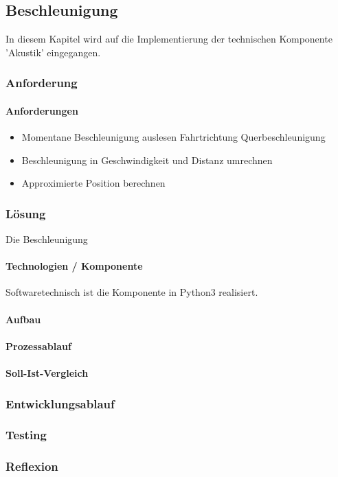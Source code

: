 \documentclass[../../main.tex]{subfiles}
\begin{document}
\subsection{Beschleunigung}
In diesem Kapitel wird auf die Implementierung der technischen Komponente 'Akustik' eingegangen.
\subsubsection{Anforderung}

\paragraph{Anforderungen}
\begin{itemize}
    \item Momentane Beschleunigung auslesen
      \subitem Fahrtrichtung
      \subitem Querbeschleunigung
    \item Beschleunigung in Geschwindigkeit und Distanz umrechnen
    \item Approximierte Position berechnen
\end{itemize}

\subsubsection{Lösung}
Die Beschleunigung 

\paragraph{Technologien / Komponente}
Softwaretechnisch ist die Komponente in Python3 realisiert. 

\paragraph{Aufbau}

\paragraph{Prozessablauf}

\paragraph{Soll-Ist-Vergleich}

\subsubsection{Entwicklungsablauf}

\subsubsection{Testing}

\subsubsection{Reflexion}
\end{document}
